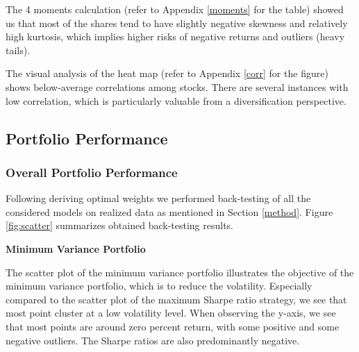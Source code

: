 \documentclass[a4paper,12pt]{article}
\begin{document}
The 4 moments calculation (refer to Appendix \ref{moments} for the table) showed us that most of the shares tend to have slightly negative skewness and relatively high kurtosis, which implies higher risks of negative returns and outliers (heavy tails).

 The visual analysis of the heat map (refer to Appendix \ref{corr} for the figure) shows below-average correlations among stocks. There are several instances with low correlation, which is particularly valuable from a diversification perspective.

\subsection{Portfolio Performance}

\subsubsection{Overall Portfolio Performance}

Following deriving optimal weights we performed back-testing of all the considered models on realized data as mentioned in Section \ref{method}. Figure \ref{fig:scatter} summarizes obtained back-testing results. 

\textbf{Minimum Variance Portfolio}

The scatter plot of the minimum variance portfolio illustrates the objective of the minimum variance portfolio, which is to reduce the volatility. Especially compared to the scatter plot of the maximum Sharpe ratio strategy, we see that most point cluster at a low volatility level. When observing the y-axis, we see that most points are around zero percent return, with some positive and some negative outliers. The Sharpe ratios are also predominantly negative.
\end{document}
